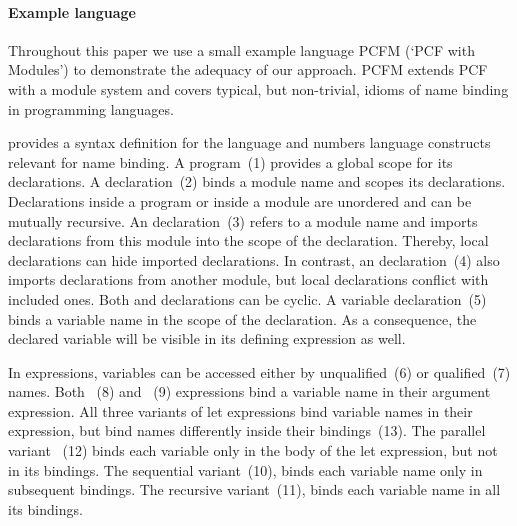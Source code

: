 % 


\paragraph{Example language}

Throughout this paper we use a small example language PCFM (`PCF with Modules') to demonstrate the adequacy of our approach.
PCFM extends PCF~\cite{Mitchell1996} with a module system and 
  covers typical, but non-trivial, idioms of name binding in programming languages.


  
 provides a syntax definition for the language and numbers language constructs relevant for name binding.
A program~(1) provides a global scope for its declarations.
A  declaration~(2) binds a module name and scopes its declarations.
Declarations inside a program or inside a module are unordered and can be mutually recursive.
An  declaration~(3) refers to a module name and 
  imports declarations from this module into the scope of the declaration.
Thereby, local declarations can hide imported declarations.
In contrast, an  declaration~(4) also imports declarations from another module,
  but local declarations conflict with included ones.
Both  and  declarations can be cyclic.
A variable declaration~(5) binds a variable name in the scope of the declaration.
As a consequence, the declared variable will be visible in its defining expression as well.

In expressions, variables can be accessed either by unqualified~(6) or qualified~(7) names.
Both ~(8) and ~(9) expressions bind a variable name in their argument expression.
All three variants of let expressions bind variable names in their expression, 
  but bind names differently inside their bindings~(13).
The parallel variant ~(12) binds 
  each variable only in the body of the let expression, but not in its bindings.
The sequential  variant~(10), 
  binds each variable name only in subsequent bindings.
The recursive  variant~(11),
  binds each variable name in all its bindings.


